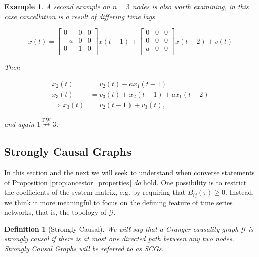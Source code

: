 \documentclass{statsoc}
\def\npwgc{\overset{\text{PW}}{\nrightarrow}}  %
\def\gcg{\mathcal{G}}  %
\newtheorem{definition}{Definition}
\newtheorem{example}{Example}
\begin{document}
\begin{example}
  \label{ex:lag_cancellation}
  A second example on $n = 3$ nodes is also worth examining, in this case
  cancellation is a result of differing time lags.

\begin{equation*}
  x(t) =
  \left[
    \begin{array}{ccc}
      0 & 0 & 0\\
      -a & 0 & 0\\
      0 & 1 & 0\\
    \end{array}
  \right] x(t - 1) +
  \left[
    \begin{array}{ccc}
      0 & 0 & 0\\
      0 & 0 & 0\\
      a & 0 & 0\\
    \end{array}
  \right] x(t - 2) + v(t)
\end{equation*}

Then

\begin{align*}
  x_2(t) &= v_2(t) - ax_1(t - 1)\\
  x_3(t) &= v_3(t) + x_2(t - 1) + ax_1(t - 2)\\
  \Rightarrow x_3(t) &= v_2(t - 1) + v_3(t),
\end{align*}

and again $1 \npwgc 3$.
\end{example}

\subsection{Strongly Causal Graphs}
\label{sec:strongly_causal_graphs}

In this section and the next we will seek to understand when converse
statements of Proposition \ref{prop:ancestor_properties} \textit{do}
hold.  One possibility is to restrict the coefficients of the system
matrix, e.g. by requiring that $B_{ij}(\tau) \ge 0$.  Instead,
we think it more meaningful to focus on the defining feature of
time series networks, that is, the topology of $\gcg$.

\begin{definition}[Strongly Causal]
  \label{def:strongly_causal}
  We will say that a Granger-causality graph $\gcg$ is
  \textit{strongly causal} if there is at most one directed path between
  any two nodes.  Strongly Causal Graphs will be referred to as SCGs.
\end{definition}
\end{document}
